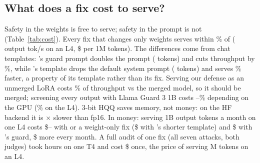 \subsection{What does a fix cost to serve?\stagetwo}
\label{sec:cost}
\begin{table}[t]
\centering\small\setlength{\tabcolsep}{3pt}
\resizebox{\columnwidth}{!}{}
\caption{Serving cost: output tokens/s (vLLM fp16, 256 prompts $\times$ 256 tokens, each fix with its own chat
template; mean of 3 repeats, sd $<$2\%) and \$ per 1M output tokens at Hugging Face on-demand prices
(T4 \$/h, L4 \$/h, A100 \$/h; other providers in
Table~\ref{tab:costfull}).\stagetwo}
\label{tab:cost}
\end{table}
Safety in the weights is free to serve; safety in the prompt is not (Table~\ref{tab:cost}). Every fix that changes
only weights serves within \% of  ( output tok/s on an L4,
\$ per 1M tokens). The differences come from chat templates: 's guard prompt doubles
the prompt ( tokens) and cuts throughput by \%, while 's template drops
the default system prompt ( tokens) and serves \% faster, a property of its
template rather than its fix. Serving our defense as an unmerged LoRA costs \% of
throughput vs the merged model, so it should be merged; screening every output with Llama Guard 3 1B costs
--\% depending on the GPU (\% on the L4). 3-bit HQQ saves
memory, not money: on the HF backend it is $\times$ slower than fp16. In money: serving
1B output tokens a month on one L4 costs \$-- with  or a
weight-only fix (\$ with 's shorter template) and \$ with 's guard,
\$ more every month. A full audit of
one fix (all seven attacks, both judges) took  hours on one T4 and cost \$
once, the price of serving M tokens on an L4.
